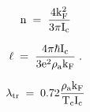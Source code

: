 {\newpage
\clearpage
\samepage \begin{displaymath}\rm n \; = \; \frac{4k_F^2}{3 \pi I_c}
\end{displaymath}
}

{\newpage
\clearpage
\samepage \begin{displaymath}\rm \ell \; = \; \frac{4 \pi \hbar I_c}{3 e^2 \rho_a k_F} \; .
\end{displaymath}
}

{\newpage
\clearpage
\samepage \begin{displaymath}\rm \lambda_{tr} \; = \; 0.72 \frac{\rho_a k_F}{T_c I_c}
\end{displaymath}
}



